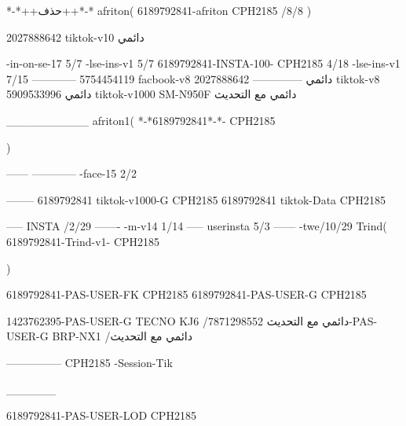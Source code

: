 *-*++حذف++*-*
afriton(
6189792841-afriton CPH2185  /8/8
)

2027888642 tiktok-v10
دائمي

-in-on-se-17 5/7
-lse-ins-v1 5/7
6189792841-INSTA-100- CPH2185 4/18
-lse-ins-v1 7/15
------------
5754454119 facbook-v8
دائمي
--------------
2027888642 tiktok-v8
دائمي
5909533996 tiktok-v1000  SM-N950F
دائمي مع التحديث

__________
afriton1(
*-*6189792841*-*- CPH2185 

)


------
------------
-face-15 2/2

--------
6189792841 tiktok-v1000-G CPH2185 
6189792841 tiktok-Data CPH2185 

-----
 INSTA /2/29
-------
-m-v14 1/14
-----
userinsta 5/3
------
-twe/10/29
Trind(
6189792841-Trind-v1- CPH2185 

)

6189792841-PAS-USER-FK CPH2185 
6189792841-PAS-USER-G CPH2185 

1423762395-PAS-USER-G TECNO KJ6  /دائمي مع التحديث
7871298552-PAS-USER-G BRP-NX1  /دائمي مع التحديث

    ---------------
 CPH2185 -Session-Tik

______

6189792841-PAS-USER-LOD CPH2185 
